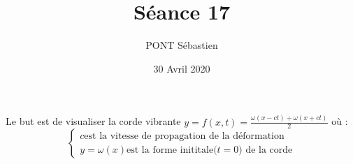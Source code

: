 \documentclass{sebaClass}
\title{Séance 17}
\author{PONT Sébastien}
\date{30 Avril 2020}
\begin{document}
\maketitle

Le but est de visualiser la corde vibrante $y = f(x, t) =
  \frac{\omega(x-ct)+\omega(x+ct)}{2}$ où :
\[
  \left\{
  \begin{array}{r}
    c \text{est la vitesse de propagation de la déformation} \\
    y = \omega(x) \text{est la forme inititale(}t=0\text{) de la corde}
  \end{array}
  \right.
\]




\end{document}
